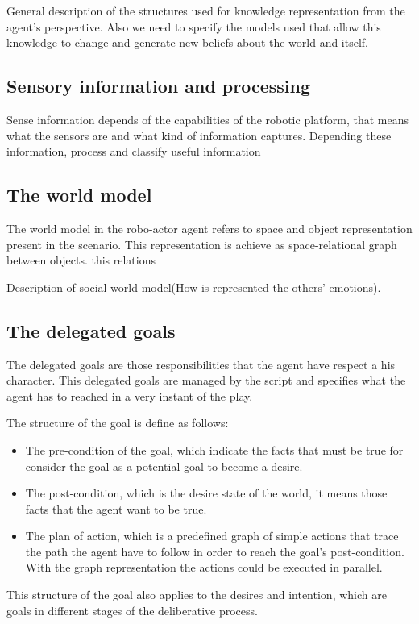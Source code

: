 General description of the structures used for knowledge representation from the agent's perspective. Also we need to specify the models used that allow this knowledge to change and generate new beliefs about the world and itself.

\subsection{Sensory information and processing}
Sense information depends of the capabilities of the robotic platform, that means what the sensors are and what kind of information captures. Depending these information, process and classify useful information 

\subsection{The world model}
The world model in the robo-actor agent refers to space and object representation present in the scenario. This representation is achieve as space-relational graph between objects. this relations 

Description of social world model(How is represented the others' emotions).

\subsection{The delegated goals}
The delegated goals are those responsibilities that the agent have respect a his character. This delegated goals are managed by the script and specifies what the agent has to reached in a very instant of the play.

The structure of the goal is define as follows:
\begin{itemize}
\item The pre-condition of the goal, which indicate the facts that must be true for consider the goal as a potential goal to become a desire.

\item The post-condition, which is the desire state of the world, it means those facts that the agent want to be true.

\item The plan of action, which is a predefined graph of simple actions that trace the path the agent have to follow in order to reach the goal's post-condition. With the graph representation the actions could be executed in parallel.
\end{itemize}

This structure of the goal also applies to the desires and intention, which are goals in different stages of the deliberative process. 

